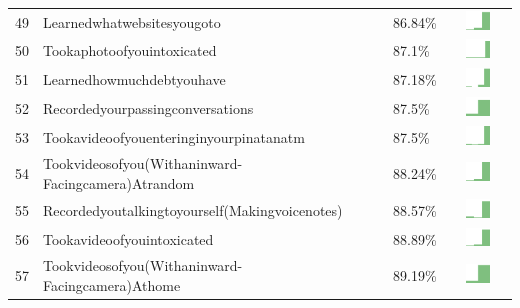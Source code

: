 \documentclass[a4paper,12pt]{article}
\begin{document}
\begin{longtable}{| p{0.5cm} | p{7cm} | p{1cm} | c |}
49 & Learnedwhatwebsitesyougoto & 86.84\% & \includegraphics[width = 2cm, height = 0.5cm]{learnedwhatwebsitesyougotoWORKCONTACTS} \\  
50 & Tookaphotoofyouintoxicated & 87.1\% & \includegraphics[width = 2cm, height = 0.5cm]{tookaphotoofyouintoxicatedWORKCONTACTS} \\  
51 & Learnedhowmuchdebtyouhave & 87.18\% & \includegraphics[width = 2cm, height = 0.5cm]{learnedhowmuchdebtyouhaveWORKCONTACTS} \\  
52 & Recordedyourpassingconversations & 87.5\% & \includegraphics[width = 2cm, height = 0.5cm]{recordedyourpassingconversationsWORKCONTACTS} \\  
53 & Tookavideoofyouenteringinyourpinatanatm & 87.5\% & \includegraphics[width = 2cm, height = 0.5cm]{tookavideoofyouenteringinyourPINatanATMWORKCONTACTS} \\  
54 & Tookvideosofyou(Withaninward-Facingcamera)Atrandom & 88.24\% & \includegraphics[width = 2cm, height = 0.5cm]{tookvideosofyou(withaninward-facingcamera)atrandomWORKCONTACTS} \\  
55 & Recordedyoutalkingtoyourself(Makingvoicenotes) & 88.57\% & \includegraphics[width = 2cm, height = 0.5cm]{recordedyoutalkingtoyourself(makingvoicenotes)WORKCONTACTS} \\  
56 & Tookavideoofyouintoxicated & 88.89\% & \includegraphics[width = 2cm, height = 0.5cm]{tookavideoofyouintoxicatedWORKCONTACTS} \\  
57 & Tookvideosofyou(Withaninward-Facingcamera)Athome & 89.19\% & \includegraphics[width = 2cm, height = 0.5cm]{tookvideosofyou(withaninward-facingcamera)athomeWORKCONTACTS} \\  

\end{longtable}
\end{document}
